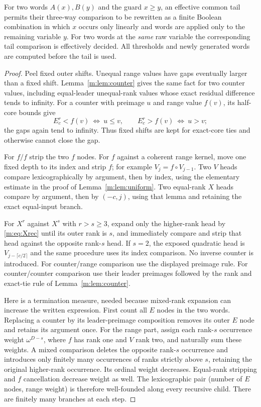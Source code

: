 \begin{lemma}\label{m:lem:guards}
For two words $A(x),B(y)$ and the guard $x\ge y$, an effective common
tail permits their three-way comparison to be rewritten as a finite Boolean
combination in which $x$ occurs only linearly and words are applied only
to the remaining variable $y$. For two words at the \emph{same} raw
variable the corresponding tail comparison is effectively decided.
All thresholds and newly generated words are computed before the tail is
used.
\end{lemma}
\begin{proof}
Peel fixed outer shifts. Unequal range values have gaps eventually larger
than a fixed shift. Lemma~\ref{m:lem:counter} gives the same fact for two
counter values, including equal-leader unequal-rank values whose exact
residual difference tends to infinity. For a counter with preimage $u$
and range value $f(v)$, its half-core bounds give
\[
 E^r_c<f(v)\ \Longleftrightarrow\ u\le v,
 \qquad E^r_c>f(v)\ \Longleftrightarrow\ u>v;
\]
the gaps again tend to infinity. Thus fixed shifts are kept for exact-core
ties and otherwise cannot close the gap.

For $f/f$ strip the two $f$ nodes. For $f$ against a coherent range
kernel, move one fixed depth to its index and strip $f$; for example
$V_j=f\circ V_{j-1}$. Two $V$ heads compare lexicographically by argument,
then by index, using the elementary estimate in the proof of
Lemma~\ref{m:lem:uniform}. Two equal-rank $X$ heads compare by argument,
then by $(-c,j)$, using that lemma and retaining the exact equal-input
branch.

For $X^r$ against $X^s$ with $r>s\ge3$, expand only the higher-rank head
by \eqref{m:eq:Xrec} until its outer rank is $s$, and immediately compare
and strip that head against the opposite rank-$s$ head. If $s=2$,
the exposed quadratic head is $V_{j-\lceil c/2\rceil}$ and the same
procedure uses its index comparison. No inverse counter is introduced.
For counter/range comparison use the displayed preimage rule. For
counter/counter comparison use their leader preimages followed by the
rank and exact-tie rule of Lemma~\ref{m:lem:counter}.

Here is a termination measure, needed because mixed-rank expansion can
increase the written expression. First count all $E$ nodes in the two
words. Replacing a counter by its leader-preimage composition removes
its outer $E$ node and retains its argument once. For the range part,
assign each rank-$s$ occurrence weight $\omega^{D-s}$, where $f$ has
rank one and $V$ rank two, and naturally sum these weights. A mixed
comparison deletes the opposite rank-$s$ occurrence and introduces only
finitely many occurrences of ranks strictly above $s$, retaining the
original higher-rank occurrence. Its ordinal weight decreases. Equal-rank
stripping and $f$ cancellation decrease weight as well. The lexicographic
pair (number of $E$ nodes, range weight) is therefore well-founded along
every recursive child. There are finitely many branches at each step.


\end{proof}
